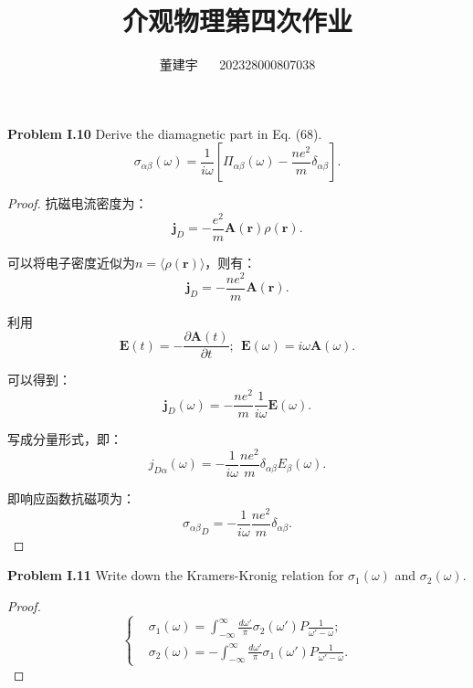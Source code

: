 \documentclass[reqno,a4paper,12pt]{amsart}
\title{介观物理第四次作业}
\author{董建宇 ~~ 202328000807038}
\begin{document}
\maketitle
\titleformat{\section}[hang]{\small}{\thesection}{0.8em}{}{}
\titleformat{\subsection}[hang]{\small}{\thesubsection}{0.8em}{}{}

\textbf{Problem I.10} Derive the diamagnetic part in Eq. (68).
\begin{equation}
	\tag{68}\sigma_{\alpha\beta}(\omega) = \frac{1}{i\omega} \left[ \Pi_{\alpha\beta}(\omega) - \frac{ne^2}{m} \delta_{\alpha\beta} \right]. 
\end{equation}

\begin{proof}
抗磁电流密度为：
\[
	\mathbf{j}_D = -\frac{e^2}{m}\mathbf{A}(\mathbf{r}) \rho(\mathbf{r}).
\]

可以将电子密度近似为$n = \langle \rho(\mathbf{r}) \rangle$，则有：
\[
	\mathbf{j}_D = -\frac{ne^2}{m}\mathbf{A}(\mathbf{r}).
\]

利用
\[
	\mathbf{E}(t) = -\frac{\partial \mathbf{A}(t)}{\partial t}; \ \ \mathbf{E}(\omega) = i\omega \mathbf{A}(\omega).
\]

可以得到：
\[
	\mathbf{j}_D(\omega) = -\frac{ne^2}{m} \frac{1}{i\omega} \mathbf{E}(\omega).
\]

写成分量形式，即：
\[
	j_{D\alpha}(\omega) = -\frac{1}{i\omega} \frac{ne^2}{m} \delta_{\alpha\beta} E_{\beta}(\omega).
\]

即响应函数抗磁项为：
\[
	{\sigma_{\alpha\beta}}_D = -\frac{1}{i\omega} \frac{ne^2}{m} \delta_{\alpha\beta}.
\]

\end{proof}


\textbf{Problem I.11} Write down the Kramers-Kronig relation for $\sigma_1(\omega)$ and $\sigma_2(\omega)$.

\begin{proof}
\[
\left\{
\begin{aligned}
	&\sigma_1(\omega) = \int_{-\infty}^\infty \frac{d\omega'}{\pi} \sigma_2(\omega') P \frac{1}{\omega'-\omega}; \\
	&\sigma_2(\omega) = -\int_{-\infty}^\infty \frac{d\omega'}{\pi} \sigma_1(\omega') P \frac{1}{\omega'-\omega}.
\end{aligned}
\right.
\]
\end{proof}
\end{document}
